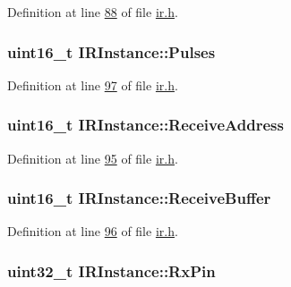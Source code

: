 Definition at line \hyperlink{ir_8h_source_l00088}{88} of file \hyperlink{ir_8h_source}{ir.\-h}.

\hypertarget{struct_i_r_instance_a374091556baaf95cb29a195e877efc1c}{
\subsubsection[{Pulses}]{\setlength{\rightskip}{0pt plus 5cm}uint16\-\_\-t I\-R\-Instance\-::\-Pulses}}\label{struct_i_r_instance_a374091556baaf95cb29a195e877efc1c}


Definition at line \hyperlink{ir_8h_source_l00097}{97} of file \hyperlink{ir_8h_source}{ir.\-h}.

\hypertarget{struct_i_r_instance_a76f9d50da2a9a8c4e4ee3f61e2296514}{
\subsubsection[{Receive\-Address}]{\setlength{\rightskip}{0pt plus 5cm}uint16\-\_\-t I\-R\-Instance\-::\-Receive\-Address}}\label{struct_i_r_instance_a76f9d50da2a9a8c4e4ee3f61e2296514}


Definition at line \hyperlink{ir_8h_source_l00095}{95} of file \hyperlink{ir_8h_source}{ir.\-h}.

\hypertarget{struct_i_r_instance_aba9722c0b3b4643583f06d05d23bc54d}{
\subsubsection[{Receive\-Buffer}]{\setlength{\rightskip}{0pt plus 5cm}uint16\-\_\-t I\-R\-Instance\-::\-Receive\-Buffer}}\label{struct_i_r_instance_aba9722c0b3b4643583f06d05d23bc54d}


Definition at line \hyperlink{ir_8h_source_l00096}{96} of file \hyperlink{ir_8h_source}{ir.\-h}.

\hypertarget{struct_i_r_instance_ab9fd2a831b0252be9553645df9250c54}{
\subsubsection[{Rx\-Pin}]{\setlength{\rightskip}{0pt plus 5cm}uint32\-\_\-t I\-R\-Instance\-::\-Rx\-Pin}}\label{struct_i_r_instance_ab9fd2a831b0252be9553645df9250c54}


